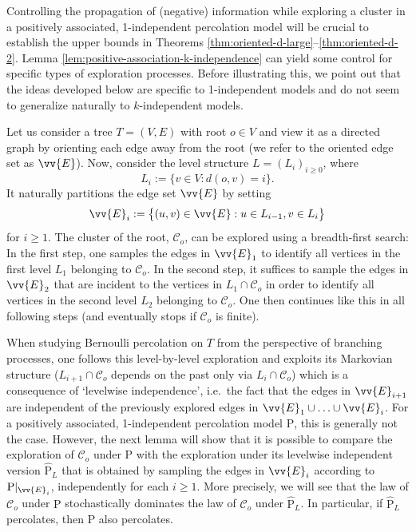 \documentclass[11pt]{article}
\renewcommand{\P}{\mathrm{P}}
\theoremstyle{remark}
\begin{document}
Controlling the propagation of (negative) information while exploring a cluster in a positively associated, 1-independent percolation model will be crucial to establish the upper bounds in Theorems \ref{thm:oriented-d-large}--\ref{thm:oriented-d-2}. Lemma \ref{lem:positive-association-k-independence} can yield some control for specific types of exploration processes. Before illustrating this, we point out that the ideas developed below are specific to 1-independent models and do not seem to generalize naturally to $k$-independent models. 

Let us consider a tree $T=(V,E)$ with root $o \in V$ and  view it as a directed graph by orienting each edge away from the root (we refer to the oriented edge set as $\vv{E}$). Now, consider the level structure $L = (L_i)_{i\ge 0}$, where 
\begin{equation}\label{eq:tree-level-structure}
	L_i := \big\{v \in V : d(o,v)=i\big\}.
\end{equation}
It naturally partitions the edge set $\vv{E}$ by setting
\begin{equation}
	\vv{E}_{i} := \big\{(u,v) \in \vv{E} : u \in L_{i-1}, v \in L_i\big\}
\end{equation}
for $i \ge 1$. 
The cluster of the root, $\mathcal C_o$, can be explored using a breadth-first search: In the first step, one samples the edges in $\vv{E}_1$ to identify all vertices in the first level $L_1$ belonging to $\mathcal C_o$. In the second step, it  suffices to sample the edges in $\vv{E}_2$ that are incident to the vertices in $L_1 \cap \mathcal C_o$ in order to identify all vertices in the second level $L_2$ belonging to $\mathcal C_o$. One then continues like this in all following steps (and eventually stops if $\mathcal C_o$ is finite). 

When studying Bernoulli percolation on $T$ from the perspective of branching processes, one follows this level-by-level exploration and exploits its Markovian structure ($L_{i+1} \cap \mathcal C_o$ depends on the past only via $L_{i} \cap \mathcal C_o$) which is a consequence of `levelwise independence', i.e.\ the fact that the edges in $\vv{E}_{i+1}$ are independent of the previously explored edges in $\vv{E}_1 \cup \ldots \cup \vv{E}_i$. For a positively associated, 1-independent percolation model $\P$, this is generally not the case. However, the next lemma will show that it is possible to compare the exploration of $\mathcal C_o$ under $\P$ with the exploration under its levelwise independent version $\hat{\P}_L$ that is obtained by sampling the edges in $\vv{E}_i$ according to $\P\vert_{\vv{E}_i}$, independently for each $i\ge 1$. More precisely, we will see that  the law of $\mathcal C_o$ under $\P$ stochastically dominates the law of $\mathcal C_o$ under $\hat{\P}_L$. In particular, if $\hat{\P}_L$ percolates, then $\P$ also percolates. 
\end{document}
